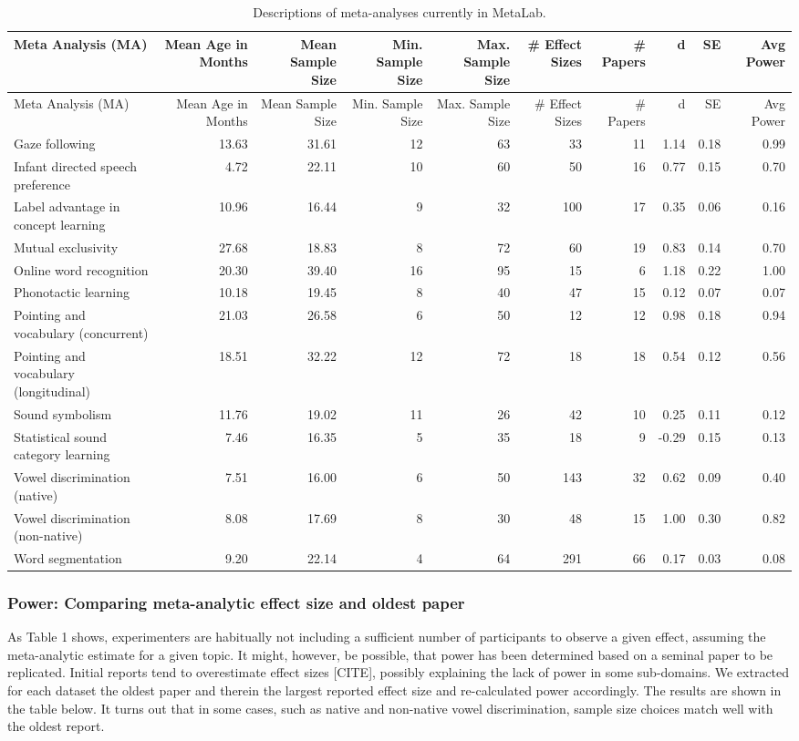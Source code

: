 \documentclass[english,floatsintext,man]{apa6}
\begin{document}
\begin{longtable}[c]{@{}lrrrrrrrrr@{}}
\caption{Descriptions of meta-analyses currently in
MetaLab.}\tabularnewline
\toprule
Meta Analysis (MA) & Mean Age in Months & Mean Sample Size & Min. Sample
Size & Max. Sample Size & \# Effect Sizes & \# Papers & d & SE & Avg
Power\tabularnewline
\midrule
\endfirsthead
\toprule
Meta Analysis (MA) & Mean Age in Months & Mean Sample Size & Min. Sample
Size & Max. Sample Size & \# Effect Sizes & \# Papers & d & SE & Avg
Power\tabularnewline
\midrule
\endhead
Gaze following & 13.63 & 31.61 & 12 & 63 & 33 & 11 & 1.14 & 0.18 &
0.99\tabularnewline
Infant directed speech preference & 4.72 & 22.11 & 10 & 60 & 50 & 16 &
0.77 & 0.15 & 0.70\tabularnewline
Label advantage in concept learning & 10.96 & 16.44 & 9 & 32 & 100 & 17
& 0.35 & 0.06 & 0.16\tabularnewline
Mutual exclusivity & 27.68 & 18.83 & 8 & 72 & 60 & 19 & 0.83 & 0.14 &
0.70\tabularnewline
Online word recognition & 20.30 & 39.40 & 16 & 95 & 15 & 6 & 1.18 & 0.22
& 1.00\tabularnewline
Phonotactic learning & 10.18 & 19.45 & 8 & 40 & 47 & 15 & 0.12 & 0.07 &
0.07\tabularnewline
Pointing and vocabulary (concurrent) & 21.03 & 26.58 & 6 & 50 & 12 & 12
& 0.98 & 0.18 & 0.94\tabularnewline
Pointing and vocabulary (longitudinal) & 18.51 & 32.22 & 12 & 72 & 18 &
18 & 0.54 & 0.12 & 0.56\tabularnewline
Sound symbolism & 11.76 & 19.02 & 11 & 26 & 42 & 10 & 0.25 & 0.11 &
0.12\tabularnewline
Statistical sound category learning & 7.46 & 16.35 & 5 & 35 & 18 & 9 &
-0.29 & 0.15 & 0.13\tabularnewline
Vowel discrimination (native) & 7.51 & 16.00 & 6 & 50 & 143 & 32 & 0.62
& 0.09 & 0.40\tabularnewline
Vowel discrimination (non-native) & 8.08 & 17.69 & 8 & 30 & 48 & 15 &
1.00 & 0.30 & 0.82\tabularnewline
Word segmentation & 9.20 & 22.14 & 4 & 64 & 291 & 66 & 0.17 & 0.03 &
0.08\tabularnewline
\bottomrule
\end{longtable}

\subsubsection{Power: Comparing meta-analytic effect size and oldest
paper}\label{power-comparing-meta-analytic-effect-size-and-oldest-paper}

As Table 1 shows, experimenters are habitually not including a
sufficient number of participants to observe a given effect, assuming
the meta-analytic estimate for a given topic. It might, however, be
possible, that power has been determined based on a seminal paper to be
replicated. Initial reports tend to overestimate effect sizes
{[}CITE{]}, possibly explaining the lack of power in some sub-domains.
We extracted for each dataset the oldest paper and therein the largest
reported effect size and re-calculated power accordingly. The results
are shown in the table below. It turns out that in some cases, such as
native and non-native vowel discrimination, sample size choices match
well with the oldest report.
\end{document}
